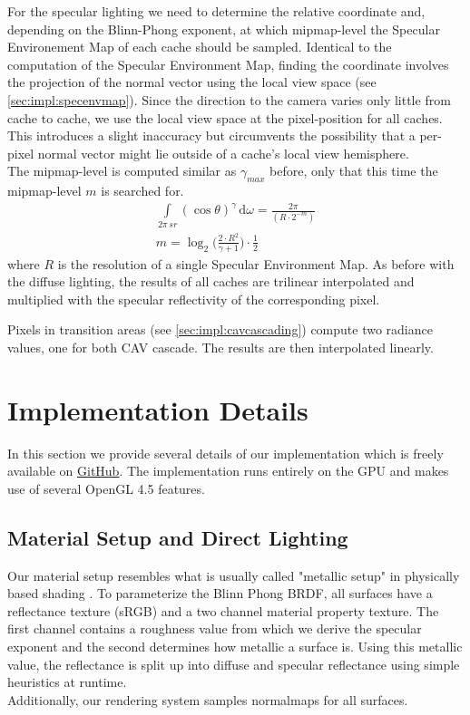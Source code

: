 \documentclass[thesis.tex]{subfiles}
\begin{document}
For the specular lighting we need to determine the relative coordinate and, depending on the Blinn-Phong exponent, at which mipmap-level the Specular Environement Map of each cache should be sampled.
Identical to the computation of the Specular Environment Map, finding the coordinate involves the projection of the normal vector using the local view space (see \autoref{sec:impl:specenvmap}).
Since the direction to the camera varies only little from cache to cache, we use the local view space at the pixel-position for all caches.
This introduces a slight inaccuracy but circumvents the possibility that a per-pixel normal vector might lie outside of a cache's local view hemisphere.\\
The mipmap-level is computed similar as $\gamma_{max}$ before, only that this time the mipmap-level $m$ is searched for.
\begin{align}
\int\limits_{2\pi\,sr} (\cos\theta)^{\gamma}  \,\mathrm{d}\omega = \frac{2\pi}{(R \cdot 2^{-m})}\\
m = \log_2 \Big(\frac{2 \cdot R^2}{\gamma + 1} \Big) \cdot \frac{1}{2}
\end{align}
where $R$ is the resolution of a single Specular Environment Map.
As before with the diffuse lighting, the results of all caches are trilinear interpolated and multiplied with the specular reflectivity of the corresponding pixel.

Pixels in transition areas (see \autoref{sec:impl:cavcascading}) compute two radiance values, one for both CAV cascade.
The results are then interpolated linearly.


\section{Implementation Details}
In this section we provide several details of our implementation which is freely available on \href{https://github.com/Wumpf/DynamicRadianceVolume}{GitHub}.
The implementation runs entirely on the GPU and makes use of several OpenGL 4.5 features.

\subsection{Material Setup and Direct Lighting}
Our material setup resembles what is usually called "metallic setup" in physically based shading .
To parameterize the Blinn Phong BRDF, all surfaces have a reflectance texture (sRGB) and a two channel material property texture.
The first channel contains a roughness value from which we derive the specular exponent and the second determines how metallic a surface is.
Using this metallic value, the reflectance is split up into diffuse and specular reflectance using simple heuristics at runtime.
\\
Additionally, our rendering system samples normalmaps for all surfaces.
\end{document}
